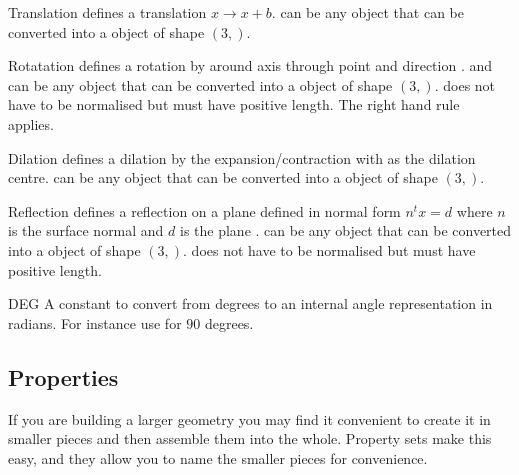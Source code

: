 \begin{classdesc}{Translation}{}
defines a translation $x \to x+b$.  can be any object that can be converted 
into a \numpy object of shape $(3,)$.
\end{classdesc}
              
\begin{classdesc}{Rotatation}{ }
defines a rotation by  around axis through point  and direction . 
 and  can be any object that can be converted 
into a \numpy object of shape $(3,)$.
 does not have to be normalised but must have positive length. The right hand rule~\cite{RIGHTHANDRULE}
applies.
\end{classdesc}


\begin{classdesc}{Dilation}{}
defines a dilation by the expansion/contraction  with 
 as the dilation centre.
 can be any object that can be converted 
into a \numpy object of shape $(3,)$.
\end{classdesc}

\begin{classdesc}{Reflection}{}
defines a reflection on a plane defined in normal form $n^t x = d$ 
where $n$ is the surface normal  and $d$ is the plane .
 can be any object that can be converted 
into a \numpy object of shape $(3,)$.
 does not have to be normalised but must have positive length. 
\end{classdesc}

\begin{datadesc}{DEG}
A constant to convert from degrees to an internal angle representation in radians. For instance use  for $90$ degrees.
\end{datadesc}

\subsection{Properties}

If you are building a larger geometry you may find it convenient to
create it in smaller pieces and then assemble them into the whole. 
Property sets make this easy, and they allow you to name the smaller
pieces for convenience.

